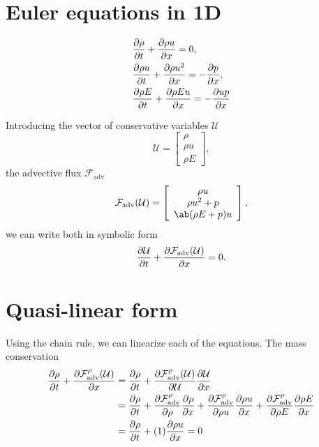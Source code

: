 \documentclass[justified, nobib]{tufte-handout}
\begin{document}
\section{Euler equations in 1D}
\begin{equation}
	\begin{split}
		 & \pdv{\rho}{t} + \pdv{\rho u}{x} = 0, \\
		 & \pdv{\rho u}{t} + \pdv{\rho u^2}{x}
		= -\pdv{p}{x} ,                         \\
		 & \pdv{\rho E}{t} + \pdv{\rho E u}{x}
		=  -\pdv{up}{x}
	\end{split}
	\label{eq:euler1d}
\end{equation}

Introducing the vector of conservative variables
\(\mathcal{U}\)
\[
	\mathcal{U} = \left[
		\begin{array}{c}
			\rho   \\
			\rho u \\
			\rho E
		\end{array} \right],
\]
the advective flux \(\mathcal{F}_\mathrm{adv}\)
\[
	\mathcal{F}_\mathrm{adv}(\mathcal{U}) = \left[
		\begin{array}{c}
			\rho u       \\
			\rho u^2 + p \\
			\ab(\rho E  + p) u
		\end{array} \right],
\]
we can write both in symbolic form
\[
	\pdv{\mathcal{U}}{t} + \pdv{\mathcal{F}_\mathrm{adv}(\mathcal{U})}{x}
	= 0.
\]

\section{Quasi-linear form}
\def\F{\mathcal{F}_\mathrm{adv}}
Using the chain rule, we can linearize each of the equations. The mass conservation
\[
	\begin{split}
		\pdv{\rho}{t} + \pdv{\F^\rho(\mathcal{U})}{x}
		 & = \pdv{\rho}{t}
		+ \pdv{\F^\rho(\mathcal{U})}{\mathcal{U}}\pdv{\mathcal{U}}{x} \\
		 & = \pdv{\rho}{t} + \pdv{\F^\rho}{\rho}\pdv{\rho}{x}
		+ \pdv{\F^\rho}{\rho u}\pdv{\rho u}{x}
		+ \pdv{\F^\rho}{\rho E}\pdv{\rho E}{x}                        \\
		 & = \pdv{\rho}{t} + (1)\pdv{\rho u}{x} = 0
	\end{split}
\]
\end{document}
